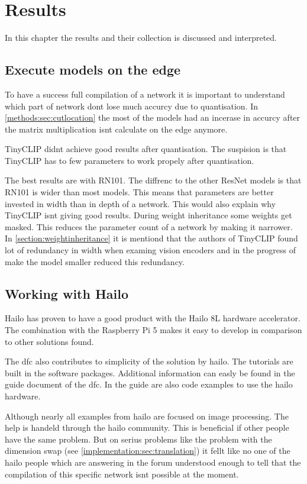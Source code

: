 \chapter{Results}
In this chapter the results and their collection is discussed and interpreted.







\section{Execute models on the edge}
To have a success full compilation of a network it is important to understand which part of network dont lose much accurcy due to quantisation.
In \cref{methods:sec:cutlocation} the most of the models had an incerase in accurcy after the matrix multiplication isnt calculate on the edge anymore.

TinyCLIP didnt achieve good results after quantisation.
The suspision is that TinyCLIP has to few parameters to work propely after quantisation.

The best results are with RN101.
The diffrenc to the other ResNet models is that RN101 is wider than most models.
This means that parameters are better invested in width than in depth of a network.
This would also explain why TinyCLIP isnt giving good results.
During weight inheritance some weights get masked.
This reduces the parameter count of a network by making it narrower.
In \cref{section:weightinheritance} it is mentiond that the authors of TinyCLIP found lot of redundancy in width when examing vision encoders and in the progress of make the model smaller reduced this redundancy.

\section{Working with Hailo}

Hailo has proven to have a good product with the Hailo 8L hardware accelerator.
The combination with the Raspberry Pi 5 makes it easy to develop in comparison to other solutions found.

The \acrshort{dfc} also contributes to simplicity of the solution by hailo.
The tutorials are built in the software packages.
Additional information can easly be found in the guide document of the \acrshort{dfc}.
In the guide are also code examples to use the hailo hardware.

Although nearly all examples from hailo are focused on image processing.
The help is handeld through the hailo community.
This is beneficial if other people have the same problem.
But on serius problems like the problem with the dimension swap (see \cref{implementation:sec:translation}) it fellt like no one of the hailo people which are answering in the forum understood enough to tell that the compilation of this specific network isnt possible at the moment.

